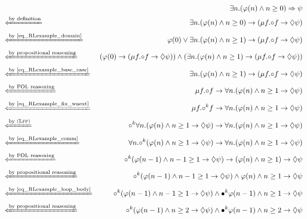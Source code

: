 \documentclass{amsart}
\begin{document}
\begin{figure}[h]
	{
		\small
		\begin{align*}
		&&
		\exists n . (\varphi(n) \wedge n \ge 0) \To \psi
		\\
		&\xif{by definition}&
		\exists n . (\varphi(n) \wedge n \ge 0) \imp (\mu f . \wnext f 
		\imp \eventually\psi)
		\\
		&\xif{by~\eqref{eq_RLexample_domain}}&
		\varphi(0) \vee \exists n . (\varphi(n) \wedge n \ge 1)
		\imp (\mu f . \wnext f \imp\eventually \psi)
		\\
		&\xif{by propositional reasoning}&
		(\varphi(0) \imp (\mu f . \wnext f \imp\eventually \psi))
		\wedge (\exists n . (\varphi(n) \wedge n \ge 1)
		\imp (\mu f . \wnext f \imp\eventually \psi))
		\\
		&\xif{by~\eqref{eq_RLexample_base_case}}&
		\exists n . (\varphi(n) \wedge n \ge 1)
		\imp (\mu f . \wnext f \imp\eventually \psi)
		\\
		&\xif{by FOL reasoning}&
		\mu f . \wnext f \imp \forall n .
		(\varphi(n) \wedge n \ge 1 \imp \eventually \psi)
		\\
		&\xif{by~\eqref{eq_RLexample_fix_wnext}}&
		\mu f . \wnext^k f \imp \forall n .
		(\varphi(n) \wedge n \ge 1 \imp \eventually \psi)
		\\
		&\xif{by~\Lfp}&
		\wnext^k \forall n . (\varphi(n) \wedge n \ge 1 \imp \eventually \psi)
		\imp
		\forall n . (\varphi(n) \wedge n \ge 1 \imp \eventually \psi)
		\\
		&\xif{by~\eqref{eq_RLexample_comm}}&
		\forall n . \wnext^k  (\varphi(n) \wedge n \ge 1 \imp \eventually \psi)
		\imp
		\forall n . (\varphi(n) \wedge n \ge 1 \imp \eventually \psi)
		\\
		&\xif{by FOL reasoning}&
		\wnext^k  (\varphi(n-1) \wedge n-1 \ge 1 \imp \eventually \psi)
		\imp
		(\varphi(n) \wedge n \ge 1) \imp \eventually \psi
		\\
		&\xif{by propositional reasoning}&
		\wnext^k  (\varphi(n-1) \wedge n-1 \ge 1 \imp \eventually \psi)
		\wedge
		\varphi(n) \wedge n \ge 1 \imp \eventually \psi
		\\
		&\xif{by~\eqref{eq_RLexample_loop_body}}&
		\wnext^k  (\varphi(n-1) \wedge n-1 \ge 1 \imp \eventually \psi)
		\wedge
		\snext^k \varphi(n-1) \wedge n \ge 1 \imp \eventually \psi
		\\
		&\xif{by propositional reasoning}&
		\wnext^k  (\varphi(n-1) \wedge n \ge 2 \imp \eventually \psi)
		\wedge \snext^k \varphi(n-1) \wedge n \ge 2 \imp \eventually \psi
		\\&&

\end{align*}}
\end{figure}
\end{document}
